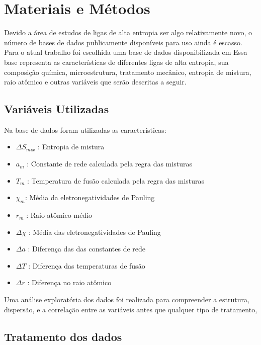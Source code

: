 \chapter{Materiais e Métodos}



 Devido a área de estudos de ligas de alta entropia ser algo relativamente novo, o número de bases de dados publicamente disponíveis para uso ainda é escasso. Para o atual trabalho foi escolhida uma base de dados disponibilizada em \cite{borg2020expanded} %
 Essa base representa as características de diferentes ligas de alta entropia, sua composição química, microestrutura, tratamento mecânico, entropia de mistura, raio atômico e outras variáveis que serão descritas a seguir.


\section{Variáveis Utilizadas}\label{sec:MAT_MET_SEC_A}

Na base de dados foram utilizadas as características:


\begin{itemize}
    \item $\Delta S_{mix}$ :  Entropia de mistura
    \item $a_{m}$ :  Constante de rede calculada pela regra das misturas
    \item $ T_{m}$ :  Temperatura de fusão calculada pela regra das misturas
    \item $\chi_{m} $:  Média da eletronegatividades de Pauling
    \item $r_{m} $ :  Raio atômico médio
    \item $\Delta \chi$ :  Média das eletronegatividades de Pauling
    \item $\Delta a$ :  Diferença das das constantes de rede
    \item $\Delta T$ :  Diferença das temperaturas de fusão
    \item $\Delta r$ : Diferença no raio atômico
\end{itemize}

Uma análise exploratória dos dados foi realizada para compreender a estrutura, dispersão, e a correlação entre as variáveis antes que qualquer tipo de tratamento, 

\section{Tratamento dos dados}\label{sec:MAT_MET_SEC_B}
